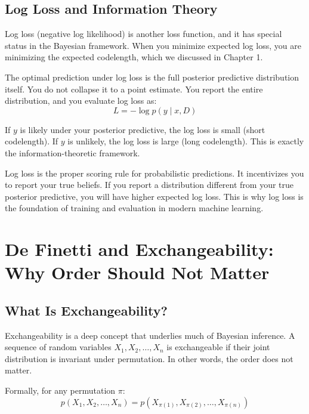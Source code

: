 \vspace{1.5em}

\subsection{Log Loss and Information Theory}

Log loss (negative log likelihood) is another loss function, and it has special status in the Bayesian framework. When you minimize expected log loss, you are minimizing the expected codelength, which we discussed in Chapter 1.

The optimal prediction under log loss is the full posterior predictive distribution itself. You do not collapse it to a point estimate. You report the entire distribution, and you evaluate log loss as:
\begin{equation}
L = -\log p(y \mid x, D)
\end{equation}

If $y$ is likely under your posterior predictive, the log loss is small (short codelength). If $y$ is unlikely, the log loss is large (long codelength). This is exactly the information-theoretic framework.

Log loss is the proper scoring rule for probabilistic predictions. It incentivizes you to report your true beliefs. If you report a distribution different from your true posterior predictive, you will have higher expected log loss. This is why log loss is the foundation of training and evaluation in modern machine learning.

\vspace{2em}

\section{De Finetti and Exchangeability: Why Order Should Not Matter}

\subsection{What Is Exchangeability?}

Exchangeability is a deep concept that underlies much of Bayesian inference. A sequence of random variables $X_1, X_2, \ldots, X_n$ is exchangeable if their joint distribution is invariant under permutation. In other words, the order does not matter.

Formally, for any permutation $\pi$:
\begin{equation}
p(X_1, X_2, \ldots, X_n) = p(X_{\pi(1)}, X_{\pi(2)}, \ldots, X_{\pi(n)})
\end{equation}

